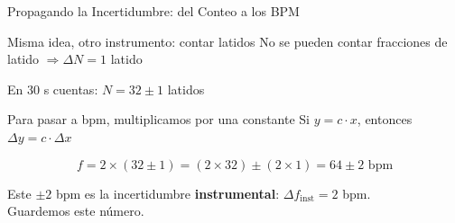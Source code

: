 \documentclass[aspectratio=169,xcolor=dvipsnames]{beamer}
\begin{document}
\begin{frame}{Propagando la Incertidumbre: del Conteo a los BPM}
	\begin{exampleblock}{Misma idea, otro instrumento: contar latidos}
		\centering
		No se pueden contar fracciones de latido $\Rightarrow \Delta N = 1$ latido
		\vspace{0.15cm}

		En 30 s cuentas: $N = 32 \pm 1$ latidos
	\end{exampleblock}

	\vspace{0.3cm}
	\begin{block}{Para pasar a bpm, multiplicamos por una constante}
		\centering
		Si $y = c\cdot x$, entonces $\Delta y = c \cdot \Delta x$
	\end{block}

	\vspace{0.2cm}
	\[
		f = 2 \times (32 \pm 1) = (2\times 32) \pm (2\times 1) = 64 \pm 2 \text{ bpm}
	\]

	\vspace{0.3cm}
	\begin{center}
		\small Este $\pm 2$ bpm es la incertidumbre \textbf{instrumental}: $\Delta f_{\text{inst}} = 2$ bpm. \\
		Guardemos este número.
	\end{center}
\end{frame}
\end{document}
